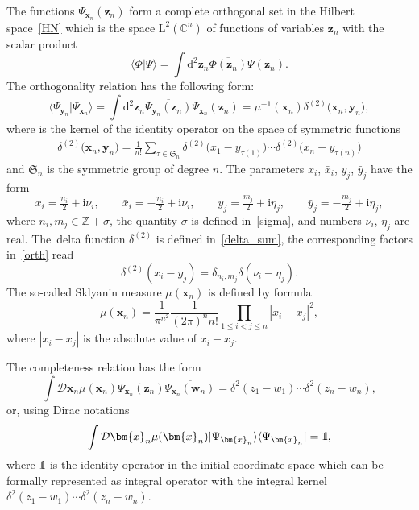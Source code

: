 \documentclass[pdftex]{sigma}
\renewcommand{\imath}{\mathrm{i}}
\newcommand{\II}{\hbox{{1}\kern-.25em\hbox{l}}}
\numberwithin{equation}{section}
\begin{document}
The functions $\Psi_{\bm{x}_n}(\bm{z}_n)$ form a complete orthogonal set in the Hilbert space~\eqref{HN} which is the space $\mathrm{L}^2\left(\mathbb C^{n}\right)$ of functions of
variables $\bm{z}_n$ with the scalar product
\begin{equation*}
	\langle\Phi|\Psi\rangle =
	\int \mathrm{d}^{2}\bm{z}_n \overline{\Phi(\bm{z}_n)} \Psi(\bm{z}_n) .
\end{equation*}
The orthogonality relation has the following form:
\begin{equation} \label{orth}
\langle\Psi_{\bm{y}_n}|\Psi_{\bm{x}_n}\rangle = \int \mathrm{d}^{2}\bm{z}_n \overline{\Psi_{\bm{y}_n}(\bm{z}_n)} \Psi_{\bm{x}_n}(\bm{z}_n) =
	\mu^{-1}(\bm{x}_n) \delta^{(2)}\bigl(\bm{x}_n,\bm{y}_n \bigr) ,
\end{equation}
where  is the kernel of the
identity operator on the space of symmetric functions
\begin{align}\label{deltasym}
\delta^{(2)}\bigl(\bm{x}_n,\bm{y}_n \bigr) =
\frac{1}{n!}\sum\limits_{\tau\in\mathfrak{S}_n}
	\delta^{(2)}\bigl(x_1-y_{\tau(1)}\bigr) \cdots \delta^{(2)}\bigl(x_n-y_{\tau(n)}\bigr)
\end{align}
and $\mathfrak{S}_n$ is the symmetric group of degree $n$.
The parameters $x_i$, $\bar{x}_i$, $y_j$, $\bar{y}_j$ have the form
\begin{equation} \label{xjyk}
	x_i = \tfrac{n_i}{2}+\imath\nu_i, \qquad
	\bar{x}_i = -\tfrac{n_i}{2}+\imath\nu_i ,\qquad
	y_j=\tfrac{m_j}{2}+\imath\eta_j, \qquad
	\bar{y}_j=-\tfrac{m_j}{2}+\imath\eta_j ,
\end{equation}
where $n_i, m_j \in \mathbb{Z}+\sigma$, the quantity $\sigma$ is defined in~\eqref{sigma}, and numbers $\nu_i$, $\eta_j$ are real.
The~delta function $\delta^{(2)}$ is defined in~\eqref{delta_sum}, the corresponding factors in~\eqref{orth} read
\begin{equation*}
	\delta^{(2)}(x_i-y_j) = \delta_{n_i,m_j} \delta(\nu_i-\eta_j) .
\end{equation*}
The so-called Sklyanin measure $\mu(\bm{x}_n)$ is defined by formula
\begin{equation} \label{mu}
\mu(\bm{x}_n) =
\frac{1}{\pi^{n^2}} \frac{1}{(2\pi)^n n!}
\prod\limits_{1\leq i<j\leq n}|x_i-x_j|^2 ,
\end{equation}
where $|x_i-x_j|$ is the absolute value of $x_i-x_j$.

The completeness relation has the form
\begin{equation*}
	\int \mathcal{D}\bm{x}_n \mu(\bm{x}_n)
	\Psi_{\bm{x}_n}(\bm{z}_n) \overline{\Psi_{\bm{x}_n}(\bm{w}_n)} =
	\delta^2(z_1-w_1) \cdots \delta^2(z_n-w_n) ,
\end{equation*}
or, using Dirac notations
\begin{equation*}
\int \mathcal{D}\bm{x}_n \mu(\bm{x}_n)
|\Psi_{\bm{x}_n}\rangle \langle\Psi_{\bm{x}_n}| = \II ,
\end{equation*}
where $\II$ is the identity operator in the initial coordinate space
which can be formally represented as integral operator with the
integral kernel $\delta^2(z_1-w_1) \cdots \delta^2(z_n-w_n)$.
\end{document}
